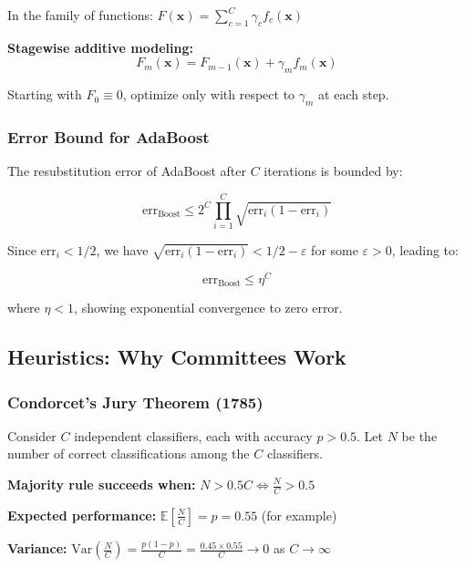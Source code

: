 \documentclass[12pt,a4paper]{article}
\begin{document}
In the family of functions: $F(\mathbf{x}) = \sum_{c=1}^C \gamma_c f_c(\mathbf{x})$

\textbf{Stagewise additive modeling:}
\begin{equation}
F_m(\mathbf{x}) = F_{m-1}(\mathbf{x}) + \gamma_m f_m(\mathbf{x})
\end{equation}

Starting with $F_0 \equiv 0$, optimize only with respect to $\gamma_m$ at each step.

\subsubsection{Error Bound for AdaBoost}

The resubstitution error of AdaBoost after $C$ iterations is bounded by:

\begin{equation}
\text{err}_{\text{Boost}} \leq 2^C \prod_{i=1}^C \sqrt{\text{err}_i (1 - \text{err}_i)}
\end{equation}

Since $\text{err}_i < 1/2$, we have $\sqrt{\text{err}_i (1 - \text{err}_i)} < 1/2 - \varepsilon$ for some $\varepsilon > 0$, leading to:

\begin{equation}
\text{err}_{\text{Boost}} \leq \eta^C
\end{equation}

where $\eta < 1$, showing exponential convergence to zero error.

\subsection{Heuristics: Why Committees Work}

\subsubsection{Condorcet's Jury Theorem (1785)}

Consider $C$ independent classifiers, each with accuracy $p > 0.5$. Let $N$ be the number of correct classifications among the $C$ classifiers.

\textbf{Majority rule succeeds when:} $N > 0.5C \iff \frac{N}{C} > 0.5$

\textbf{Expected performance:} $\mathbb{E}[\frac{N}{C}] = p = 0.55$ (for example)

\textbf{Variance:} $\text{Var}(\frac{N}{C}) = \frac{p(1-p)}{C} = \frac{0.45 \times 0.55}{C} \to 0$ as $C \to \infty$
\end{document}
